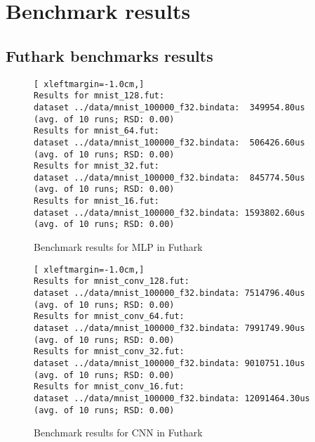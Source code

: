 \chapter{Benchmark results}
\label{sec:benchmarkres}
\section{Futhark benchmarks results}
\begin{figure}[!htbp]
\centering
\begin{lstlisting}[	xleftmargin=-1.0cm,]
Results for mnist_128.fut:
dataset ../data/mnist_100000_f32.bindata:  349954.80us (avg. of 10 runs; RSD: 0.00)
Results for mnist_64.fut:
dataset ../data/mnist_100000_f32.bindata:  506426.60us (avg. of 10 runs; RSD: 0.00)
Results for mnist_32.fut:
dataset ../data/mnist_100000_f32.bindata:  845774.50us (avg. of 10 runs; RSD: 0.00)
Results for mnist_16.fut:
dataset ../data/mnist_100000_f32.bindata: 1593802.60us (avg. of 10 runs; RSD: 0.00)
\end{lstlisting}
	\caption{Benchmark results for MLP in Futhark}
\end{figure}
\begin{figure}[!h]
	\centering
	\begin{lstlisting}[	xleftmargin=-1.0cm,]
Results for mnist_conv_128.fut:
dataset ../data/mnist_100000_f32.bindata: 7514796.40us (avg. of 10 runs; RSD: 0.00)
Results for mnist_conv_64.fut:
dataset ../data/mnist_100000_f32.bindata: 7991749.90us (avg. of 10 runs; RSD: 0.00)
Results for mnist_conv_32.fut:
dataset ../data/mnist_100000_f32.bindata: 9010751.10us (avg. of 10 runs; RSD: 0.00)
Results for mnist_conv_16.fut:
dataset ../data/mnist_100000_f32.bindata: 12091464.30us (avg. of 10 runs; RSD: 0.00)
	\end{lstlisting}
	\caption{Benchmark results for CNN in Futhark}
\end{figure}
\newpage 
